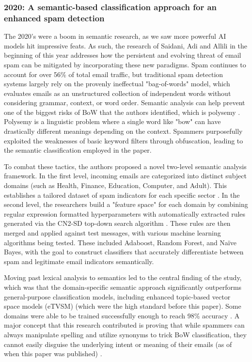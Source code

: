 \documentclass[conference]{IEEEtran}
\begin{document}
\subsubsection{2020: A semantic-based classification approach for an enhanced spam detection}
The 2020's were a boom in semantic research, as we saw more powerful AI models hit impressive feats.
As such, the research of Saidani, Adi and Allili in the beginning of this year addresses how the persistent and evolving threat of email spam can be mitigated by incorporating these new paradigms.
Spam continues to account for over 56\% of total email traffic, but traditional spam detection systems largely rely on the provenly ineffectual "bag-of-words" model, which evaluates emails as an unstructured collection of independent words without considering grammar, context, or word order.
Semantic analysis can help prevent one of the biggest risks of BoW that the authors identified, which is polysemy \cite{saidani1}.
Polysemy is a linguistic problem where a single word like "bow" can have drastically different meanings depending on the context.
Spammers purposefully exploited the weaknesses of basic keyword filters through obfuscation, leading to the semantic classification employed in the paper.

To combat these tactics, the authors proposed a novel two-level semantic analysis framework. In the first level, incoming emails are categorized into distinct subject domains (such as Health, Finance, Education, Computer, and Adult).
This establishes a tailored dataset of spam indicators for each specific sector \cite{saidani1}.
In the second level, the researchers build a "feature space" for each domain by combining regular expression formatted hyperparameters with automatically extracted rules generated via the CN2-SD top-down search algorithm \cite{saidani1}.
These rules are then merged and applied against test messages, with various machine learning algorithms being tested.
These included Adaboost, Random Forest, and Naïve Bayes, with the goal to construct classifiers that accurately differentiate between spam and legitimate email indicators semantically.

Moving past lexical analysis to semantics led to the central finding of the study, which was that the domain-specific semantic approach significantly outperforms general-purpose classification models, including enhanced topic-based vector space models (eTVSM) (which were the high standard before this paper).
Some domains were able to be trained successfully enough to reach 98\% accuracy \cite{saidani1}.
A major concept that this research contributed is proving that while spammers can always manipulate spelling and utilize synonyms to trick BoW classification, they cannot easily disguise the underlying intent or meaning of their emails (as of when this paper was published) \cite{saidani1}. 
\end{document}
